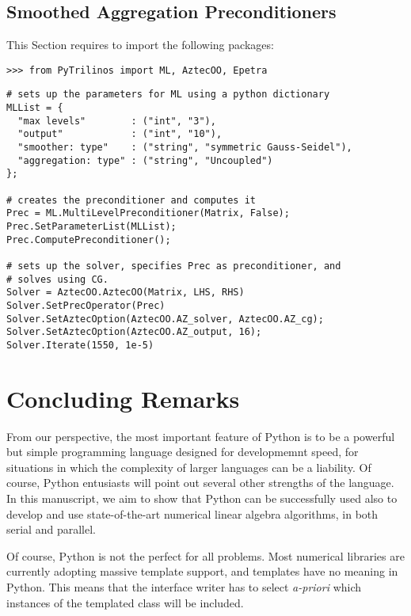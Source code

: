 \documentclass[10pt,relax]{SANDreport}
\begin{document}
\subsection{Smoothed Aggregation Preconditioners}
\label{sec:prec}

This Section requires to import the following packages:
\begin{verbatim}
>>> from PyTrilinos import ML, AztecOO, Epetra
\end{verbatim}


\begin{verbatim}
# sets up the parameters for ML using a python dictionary
MLList = {
  "max levels"        : ("int", "3"),
  "output"            : ("int", "10"),
  "smoother: type"    : ("string", "symmetric Gauss-Seidel"),
  "aggregation: type" : ("string", "Uncoupled")
};

# creates the preconditioner and computes it
Prec = ML.MultiLevelPreconditioner(Matrix, False);
Prec.SetParameterList(MLList);
Prec.ComputePreconditioner();

# sets up the solver, specifies Prec as preconditioner, and
# solves using CG.
Solver = AztecOO.AztecOO(Matrix, LHS, RHS)
Solver.SetPrecOperator(Prec)
Solver.SetAztecOption(AztecOO.AZ_solver, AztecOO.AZ_cg);
Solver.SetAztecOption(AztecOO.AZ_output, 16);
Solver.Iterate(1550, 1e-5)
\end{verbatim}

\section{Concluding Remarks}
\label{sec:concluding}

From our perspective, the most important feature of Python is to be a powerful
but simple programming language designed for developmemnt speed, for
situations in which the complexity of larger languages can be a liability. Of
course, Python entusiasts will point out several other strengths of the
language.  In this manuscript, we aim to show that Python can be 
successfully used
also to develop and use state-of-the-art numerical linear algebra algorithms,
  in both serial and parallel.

Of course, Python is not the perfect for all problems. Most numerical
libraries are currently adopting massive template support, and templates have
no meaning in Python. This means that the interface writer has to select {\sl
  a-priori} which instances of the templated class will be included.
\end{document}
